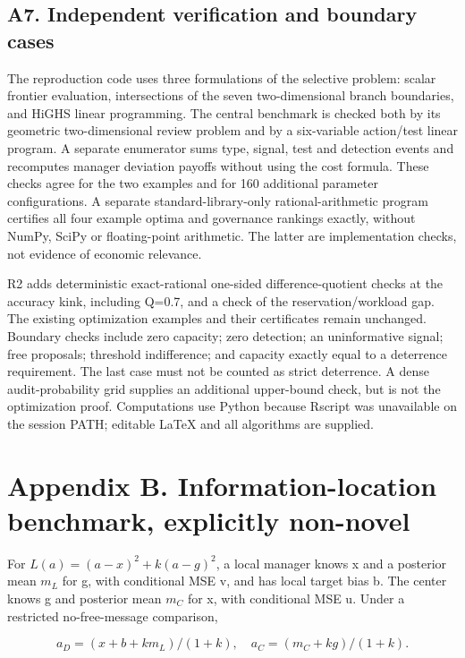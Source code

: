 \documentclass[
  11pt,
]{article}
\begin{document}
\subsection{A7. Independent verification and boundary
cases}\label{a7.-independent-verification-and-boundary-cases}

The reproduction code uses three formulations of the selective problem:
scalar frontier evaluation, intersections of the seven two-dimensional
branch boundaries, and HiGHS linear programming. The central benchmark
is checked both by its geometric two-dimensional review problem and by a
six-variable action/test linear program. A separate enumerator sums
type, signal, test and detection events and recomputes manager deviation
payoffs without using the cost formula. These checks agree for the two
examples and for 160 additional parameter configurations. A separate
standard-library-only rational-arithmetic program certifies all four
example optima and governance rankings exactly, without NumPy, SciPy or
floating-point arithmetic. The latter are implementation checks, not
evidence of economic relevance.

R2 adds deterministic exact-rational one-sided difference-quotient
checks at the accuracy kink, including Q=0.7, and a check of the
reservation/workload gap. The existing optimization examples and their
certificates remain unchanged. Boundary checks include zero capacity;
zero detection; an uninformative signal; free proposals; threshold
indifference; and capacity exactly equal to a deterrence requirement.
The last case must not be counted as strict deterrence. A dense
audit-probability grid supplies an additional upper-bound check, but is
not the optimization proof. Computations use Python because Rscript was
unavailable on the session PATH; editable LaTeX and all algorithms are
supplied.

\section{Appendix B. Information-location benchmark, explicitly
non-novel}\label{appendix-b.-information-location-benchmark-explicitly-non-novel}

For \(L(a)=(a-x)^2+k(a-g)^2\), a local manager knows x and a posterior
mean \(m_L\) for g, with conditional MSE v, and has local target bias b.
The center knows g and posterior mean \(m_C\) for x, with conditional
MSE u. Under a restricted no-free-message comparison,

\[a_D=(x+b+km_L)/(1+k),\quad a_C=(m_C+kg)/(1+k).\]
\end{document}

